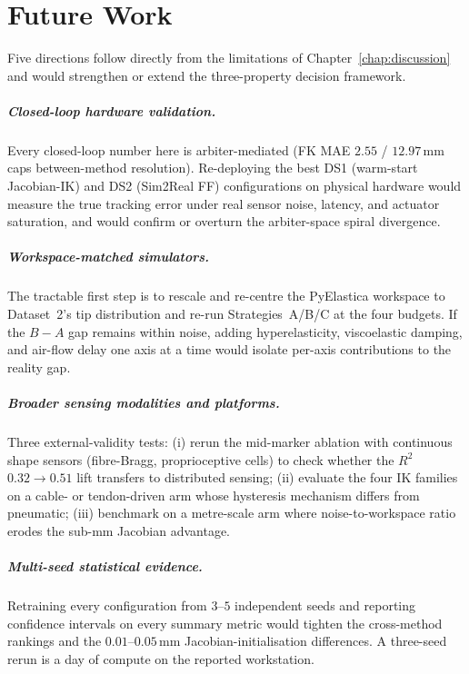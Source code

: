 \chapter{Future Work}
\label{chap:future_work}

Five directions follow directly from the limitations of Chapter~\ref{chap:discussion} and would strengthen or extend the three-property decision framework.

\paragraph{Closed-loop hardware validation.}
\label{sec:fw_hw}
Every closed-loop number here is arbiter-mediated (FK MAE $2.55$ / $12.97$\,mm caps between-method resolution). Re-deploying the best DS1 (warm-start Jacobian-IK) and DS2 (Sim2Real FF) configurations on physical hardware would measure the true tracking error under real sensor noise, latency, and actuator saturation, and would confirm or overturn the arbiter-space spiral divergence.

\paragraph{Workspace-matched simulators.}
\label{sec:fw_sim}
The tractable first step is to rescale and re-centre the PyElastica workspace to Dataset~2's tip distribution and re-run Strategies~A/B/C at the four budgets. If the $B - A$ gap remains within noise, adding hyperelasticity, viscoelastic damping, and air-flow delay one axis at a time would isolate per-axis contributions to the reality gap.

\paragraph{Broader sensing modalities and platforms.}
\label{sec:fw_sensing}
Three external-validity tests: (i) rerun the mid-marker ablation with continuous shape sensors (fibre-Bragg, proprioceptive cells) to check whether the $R^{2}$ $0.32 \to 0.51$ lift transfers to distributed sensing; (ii) evaluate the four IK families on a cable- or tendon-driven arm whose hysteresis mechanism differs from pneumatic; (iii) benchmark on a metre-scale arm where noise-to-workspace ratio erodes the sub-mm Jacobian advantage.

\paragraph{Multi-seed statistical evidence.}
\label{sec:fw_stats}
Retraining every configuration from $3$--$5$ independent seeds and reporting confidence intervals on every summary metric would tighten the cross-method rankings and the $0.01$--$0.05$\,mm Jacobian-initialisation differences. A three-seed rerun is a day of compute on the reported workstation.

